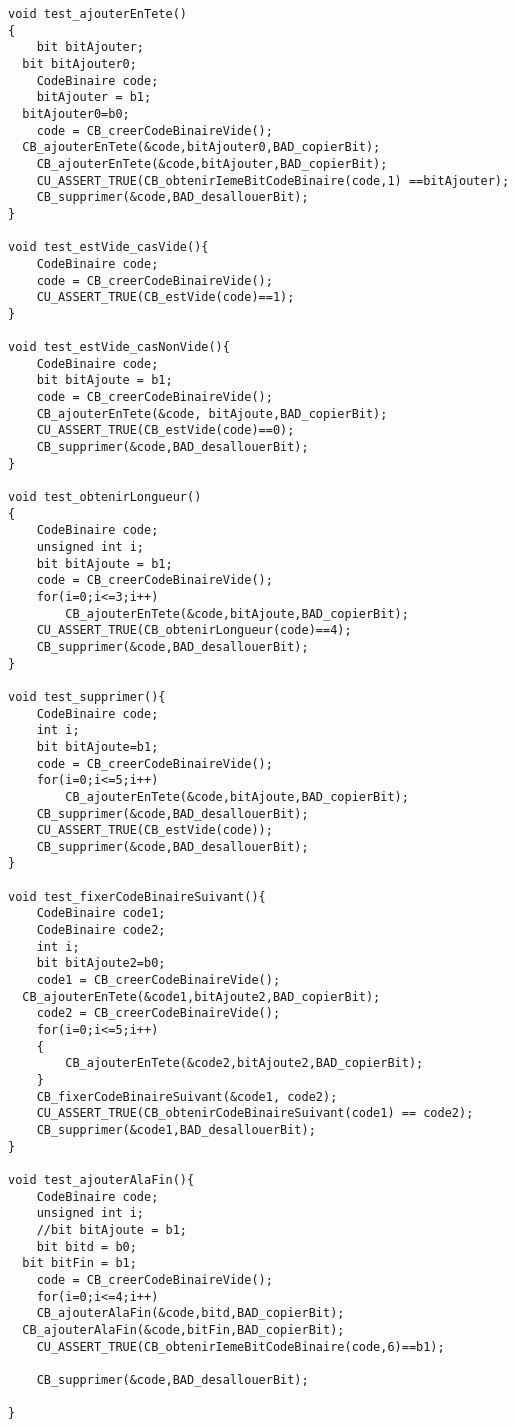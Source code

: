 \begin{verbatim}
void test_ajouterEnTete()
{
	bit bitAjouter;
  bit bitAjouter0;
	CodeBinaire code;
	bitAjouter = b1;
  bitAjouter0=b0;
	code = CB_creerCodeBinaireVide();
  CB_ajouterEnTete(&code,bitAjouter0,BAD_copierBit);
	CB_ajouterEnTete(&code,bitAjouter,BAD_copierBit);
	CU_ASSERT_TRUE(CB_obtenirIemeBitCodeBinaire(code,1) ==bitAjouter);
	CB_supprimer(&code,BAD_desallouerBit);
}

void test_estVide_casVide(){
	CodeBinaire code;
	code = CB_creerCodeBinaireVide();
	CU_ASSERT_TRUE(CB_estVide(code)==1);
}

void test_estVide_casNonVide(){
	CodeBinaire code;
	bit bitAjoute = b1;
	code = CB_creerCodeBinaireVide();
	CB_ajouterEnTete(&code, bitAjoute,BAD_copierBit);
	CU_ASSERT_TRUE(CB_estVide(code)==0);
	CB_supprimer(&code,BAD_desallouerBit);
}

void test_obtenirLongueur()
{
	CodeBinaire code;
	unsigned int i;
	bit bitAjoute = b1;
	code = CB_creerCodeBinaireVide();
	for(i=0;i<=3;i++)
		CB_ajouterEnTete(&code,bitAjoute,BAD_copierBit);
	CU_ASSERT_TRUE(CB_obtenirLongueur(code)==4);
	CB_supprimer(&code,BAD_desallouerBit);
}

void test_supprimer(){
	CodeBinaire code;
	int i;
	bit bitAjoute=b1;
	code = CB_creerCodeBinaireVide();
	for(i=0;i<=5;i++)
		CB_ajouterEnTete(&code,bitAjoute,BAD_copierBit);
	CB_supprimer(&code,BAD_desallouerBit);
	CU_ASSERT_TRUE(CB_estVide(code));
	CB_supprimer(&code,BAD_desallouerBit);
}

void test_fixerCodeBinaireSuivant(){
	CodeBinaire code1;
	CodeBinaire code2;
	int i;
	bit bitAjoute2=b0;
	code1 = CB_creerCodeBinaireVide();
  CB_ajouterEnTete(&code1,bitAjoute2,BAD_copierBit);
	code2 = CB_creerCodeBinaireVide();
	for(i=0;i<=5;i++)
	{
		CB_ajouterEnTete(&code2,bitAjoute2,BAD_copierBit);
	}
	CB_fixerCodeBinaireSuivant(&code1, code2);
	CU_ASSERT_TRUE(CB_obtenirCodeBinaireSuivant(code1) == code2);
	CB_supprimer(&code1,BAD_desallouerBit);
}

void test_ajouterAlaFin(){
	CodeBinaire code;
	unsigned int i;
	//bit bitAjoute = b1;
	bit bitd = b0;
  bit bitFin = b1;
	code = CB_creerCodeBinaireVide();
	for(i=0;i<=4;i++)
	CB_ajouterAlaFin(&code,bitd,BAD_copierBit);
  CB_ajouterAlaFin(&code,bitFin,BAD_copierBit);
	CU_ASSERT_TRUE(CB_obtenirIemeBitCodeBinaire(code,6)==b1);

	CB_supprimer(&code,BAD_desallouerBit);

}
\end{verbatim}

